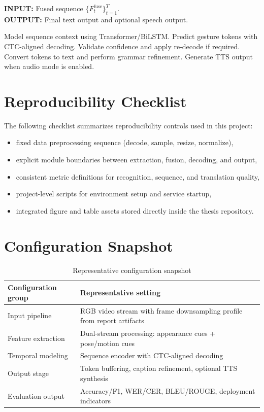 \begin{algorithm}[H]
\caption{Sequence Decoding and Output Generation}
\label{alg:seq-output}
\begin{flushleft}\small
\textbf{INPUT:} Fused sequence $\{F_t^{\mathrm{fuse}}\}_{t=1}^{T}$.\\
\textbf{OUTPUT:} Final text output and optional speech output.
\end{flushleft}
\begin{algorithmic}[1]\footnotesize
\State Model sequence context using Transformer/BiLSTM.
\State Predict gesture tokens with CTC-aligned decoding.
\State Validate confidence and apply re-decode if required.
\State Convert tokens to text and perform grammar refinement.
\State Generate TTS output when audio mode is enabled.
\end{algorithmic}
\end{algorithm}

\section{Reproducibility Checklist}
The following checklist summarizes reproducibility controls used in this project:
\begin{itemize}[leftmargin=1.5em]
\item fixed data preprocessing sequence (decode, sample, resize, normalize),
\item explicit module boundaries between extraction, fusion, decoding, and output,
\item consistent metric definitions for recognition, sequence, and translation quality,
\item project-level scripts for environment setup and service startup,
\item integrated figure and table assets stored directly inside the thesis repository.
\end{itemize}

\section{Configuration Snapshot}
\begin{table}[h]
\centering
\caption{Representative configuration snapshot}
\label{tab:appendix-config}
\begin{tabular}{|p{4.0cm}|p{7.7cm}|}
\hline
\textbf{Configuration group} & \textbf{Representative setting} \\ \hline
Input pipeline & RGB video stream with frame downsampling profile from report artifacts \\ \hline
Feature extraction & Dual-stream processing: appearance cues + pose/motion cues \\ \hline
Temporal modeling & Sequence encoder with CTC-aligned decoding \\ \hline
Output stage & Token buffering, caption refinement, optional TTS synthesis \\ \hline
Evaluation output & Accuracy/F1, WER/CER, BLEU/ROUGE, deployment indicators \\ \hline
\end{tabular}
\end{table}

